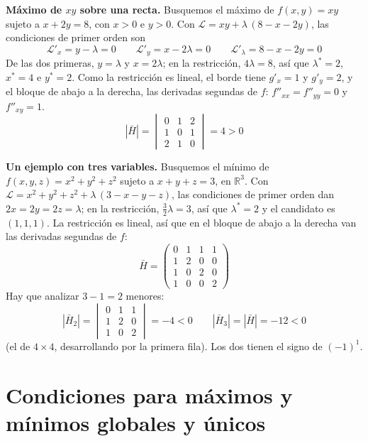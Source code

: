 \documentclass{article}
\newcommand{\R}{\ensuremath{\mathbb{R}}}
\begin{document}
\noindent\textbf{Máximo de \(xy\) sobre una recta.} Busquemos el máximo de \(f(x,y)=xy\) sujeto a \(x+2y=8\), con \(x>0\) e \(y>0\). Con \(\mathcal L=xy+\lambda\,(8-x-2y)\), las condiciones de primer orden son
\[
\mathcal L'_x=y-\lambda=0
\qquad
\mathcal L'_y=x-2\lambda=0
\qquad
\mathcal L'_\lambda=8-x-2y=0
\]
De las dos primeras, \(y=\lambda\) y \(x=2\lambda\); en la restricción, \(4\lambda=8\), así que \(\lambda^*=2\), \(x^*=4\) e \(y^*=2\). Como la restricción es lineal, el borde tiene \(g'_x=1\) y \(g'_y=2\), y el bloque de abajo a la derecha, las derivadas segundas de \(f\): \(f''_{xx}=f''_{yy}=0\) y \(f''_{xy}=1\).
\[
|\bar H|
=
\begin{vmatrix}
0 & 1 & 2\\
1 & 0 & 1\\
2 & 1 & 0
\end{vmatrix}
=4>0
\]

\medskip

\noindent\textbf{Un ejemplo con tres variables.} Busquemos el mínimo de \(f(x,y,z)=x^2+y^2+z^2\) sujeto a \(x+y+z=3\), en \(\R^3\). Con \(\mathcal L=x^2+y^2+z^2+\lambda\,(3-x-y-z)\), las condiciones de primer orden dan \(2x=2y=2z=\lambda\); en la restricción, \(\tfrac32\lambda=3\), así que \(\lambda^*=2\) y el candidato es \((1,1,1)\). La restricción es lineal, así que en el bloque de abajo a la derecha van las derivadas segundas de \(f\):
\[
\bar H
=
\begin{pmatrix}
0 & 1 & 1 & 1\\
1 & 2 & 0 & 0\\
1 & 0 & 2 & 0\\
1 & 0 & 0 & 2
\end{pmatrix}
\]
Hay que analizar \(3-1=2\) menores:
\[
|\bar H_2|
=
\begin{vmatrix}
0 & 1 & 1\\
1 & 2 & 0\\
1 & 0 & 2
\end{vmatrix}
=-4<0
\qquad
|\bar H_3|=|\bar H|=-12<0
\]
(el de \(4\times4\), desarrollando por la primera fila). Los dos tienen el signo de \((-1)^1\).



\section*{Condiciones para máximos y mínimos globales y únicos}
\end{document}
